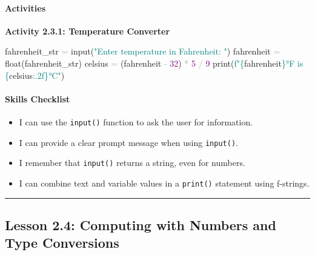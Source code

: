 \documentclass[
  justified,
  openright,
]{tufte-book}
\let\subsubsection\paragraph
\let\paragraph\paragraph
\newcommand{\BuiltInTok}[1]{#1}
\newcommand{\DecValTok}[1]{\textcolor{Purple}{#1}}
\newcommand{\NormalTok}[1]{#1}
\newcommand{\OperatorTok}[1]{\textcolor{DarkGray}{#1}}
\newcommand{\SpecialCharTok}[1]{\textcolor{Teal}{#1}}
\newcommand{\SpecialStringTok}[1]{\textcolor{Teal}{#1}}
\newcommand{\StringTok}[1]{\textcolor{Teal}{#1}}
\newenvironment{Shaded}{%
  \begin{snugshade}
}{%
  \end{snugshade}
}
\let\subsubsection\paragraph
\let\paragraph\paragraph
\providecommand{\tightlist}{%
  \setlength{\itemsep}{0pt}\setlength{\parskip}{0pt}}
\begin{document}
\subsubsection{Activities}\label{activities-4}

\textbf{Activity 2.3.1: Temperature Converter}

\begin{Shaded}
\begin{Highlighting}[]
\NormalTok{fahrenheit\_str }\OperatorTok{=} \BuiltInTok{input}\NormalTok{(}\StringTok{"Enter temperature in Fahrenheit: "}\NormalTok{)}
\NormalTok{fahrenheit }\OperatorTok{=} \BuiltInTok{float}\NormalTok{(fahrenheit\_str)}
\NormalTok{celsius }\OperatorTok{=}\NormalTok{ (fahrenheit }\OperatorTok{{-}} \DecValTok{32}\NormalTok{) }\OperatorTok{*} \DecValTok{5} \OperatorTok{/} \DecValTok{9}
\BuiltInTok{print}\NormalTok{(}\SpecialStringTok{f"}\SpecialCharTok{\{}\NormalTok{fahrenheit}\SpecialCharTok{\}}\SpecialStringTok{°F is }\SpecialCharTok{\{}\NormalTok{celsius}\SpecialCharTok{:.2f\}}\SpecialStringTok{°C"}\NormalTok{)}
\end{Highlighting}
\end{Shaded}

\subsubsection{Skills Checklist}\label{skills-checklist-9}

\begin{itemize}
\tightlist
\item[$\square$]
  I can use the \texttt{input()} function to ask the user for
  information.
\item[$\square$]
  I can provide a clear prompt message when using \texttt{input()}.
\item[$\square$]
  I remember that \texttt{input()} returns a string, even for numbers.
\item[$\square$]
  I can combine text and variable values in a \texttt{print()} statement
  using f-strings.
\end{itemize}

\begin{center}\rule{0.5\linewidth}{0.5pt}\end{center}

\subsection{Lesson 2.4: Computing with Numbers and Type
Conversions}\label{lesson-2.4-computing-with-numbers-and-type-conversions}
\end{document}
